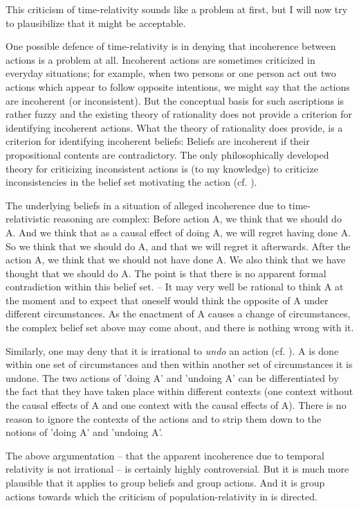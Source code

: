 This criticism of time-relativity sounds like a problem at first, but I will now try to plausibilize that it might be acceptable. 

One possible defence of time-relativity is in denying that incoherence between actions is a problem at all. Incoherent actions are sometimes criticized in everyday situations; for example, when two persons or one person act out two actions which appear to follow opposite intentions, we might say that the actions are incoherent (or inconsistent). But the conceptual basis for such ascriptions is rather fuzzy and the existing theory of rationality does not provide a criterion for identifying incoherent actions. What the theory of rationality does provide, is a criterion for identifying incoherent beliefs: Beliefs are incoherent if their propositional contents are contradictory. The only philosophically developed theory for criticizing inconsistent actions is (to my knowledge) to criticize inconsistencies in the belief set motivating the action (cf. ). 

The underlying beliefs in a situation of alleged incoherence due to time-relativistic reasoning are complex: Before action A, we think that we should do A. And we think that as a causal effect of doing A, we will regret having done A. So we think that we should do A, and that we will regret it afterwards. After the action A, we think that we should not have done A. We also think that we have thought that we should do A. The point is that there is no apparent formal contradiction within this belief set. -- It may very well be rational to think A at the moment and to expect that oneself would think the opposite of A under different circumstances. As the enactment of A causes a change of circumstances, the complex belief set above may come about, and there is nothing wrong with it. 

Similarly, one may deny that it is irrational to \emph{undo} an action (cf. ). A is done within one set of circumstances and then within another set of circumstances it is undone. The two actions of 'doing A' and 'undoing A' can be differentiated by the fact that they have taken place within different contexts (one context without the causal effects of A and one context with the causal effects of A). There is no reason to ignore the contexts of the actions and to strip them down to the notions of 'doing A' and 'undoing A'.  

The above argumentation -- that the apparent incoherence due to temporal relativity is not irrational -- is certainly highly controversial. But it is much more plausible that it applies to group beliefs and group actions. And it is group actions towards which the criticism of population-relativity in  is directed. 

